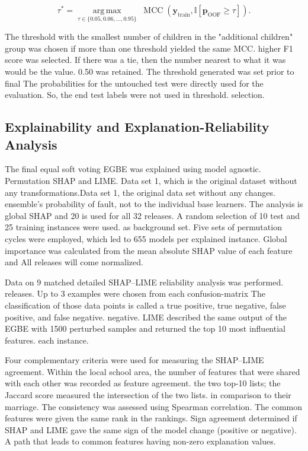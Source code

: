 \documentclass[conference]{IEEEtran}
\begin{document}
\begin{equation}
\tau^{*}
=
\underset{\tau \in \{0.05,0.06,\ldots,0.95\}}
{\operatorname{arg\,max}}
\;
\operatorname{MCC}
\left(
\mathbf{y}_{\mathrm{train}},
\mathbb{I}\!\left[
\mathbf{p}_{\mathrm{OOF}} \geq \tau
\right]
\right).
\end{equation}

The threshold with the smallest number of children in the "additional children" group was chosen if more than one threshold yielded the same MCC.
higher F1 score was selected. If there was a tie, then the number nearest to what it was would be the value.
0.50 was retained. The threshold generated was set prior to final
The probabilities for the untouched test were directly used for the evaluation.
So, the end test labels were not used in threshold.
selection.

\subsection{Explainability and Explanation-Reliability Analysis}
\label{subsec:xai-reliability}

The final equal soft voting EGBE was explained using model agnostic.
Permutation SHAP and LIME. Data set 1, which is the original dataset without any transformations.Data set 1, the original data set without any changes.
ensemble’s probability of fault, not to the individual
base learners. The analysis is global SHAP and 20 is used for all 32 releases.
A random selection of 10 test and 25 training instances were used.
as background set. Five sets of permutation cycles were employed, which led to
655 models per explained instance. Global importance was
calculated from the mean absolute SHAP value of each feature and
All releases will come normalized.

Data on 9 matched detailed SHAP–LIME reliability analysis was performed.
releases. Up to 3 examples were chosen from each confusion-matrix
The classification of those data points is called a true positive, true negative, false positive, and false negative.
negative. LIME described the same output of the EGBE with 1500
perturbed samples and returned the top 10 most influential features.
each instance.

Four complementary criteria were used for measuring the SHAP--LIME agreement.
Within the local school area, the number of features that were shared with each other was recorded as feature agreement.
the two top-10 lists; the Jaccard score measured the intersection of the two lists.
in comparison to their marriage. The consistency was assessed using Spearman correlation.
The common features were given the same rank in the rankings. Sign agreement
determined if SHAP and LIME gave the same sign of the model change (positive or negative).
A path that leads to common features having non-zero explanation values.
\end{document}
